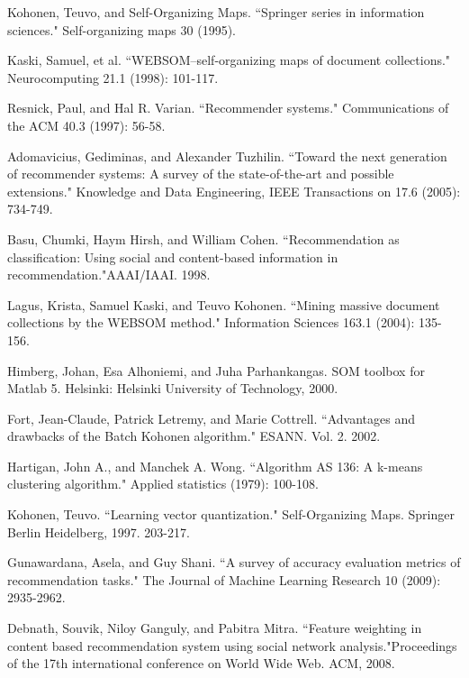 \documentclass[conference]{IEEEtran}
\begin{document}
\begin{thebibliography}{1}

Kohonen, Teuvo, and Self-Organizing Maps. ``Springer series in information sciences." Self-organizing maps 30 (1995).

Kaski, Samuel, et al. ``WEBSOM–self-organizing maps of document collections." Neurocomputing 21.1 (1998): 101-117.

Resnick, Paul, and Hal R. Varian. ``Recommender systems." Communications of the ACM 40.3 (1997): 56-58.

Adomavicius, Gediminas, and Alexander Tuzhilin. ``Toward the next generation of recommender systems: A survey of the state-of-the-art and possible extensions." Knowledge and Data Engineering, IEEE Transactions on 17.6 (2005): 734-749.

Basu, Chumki, Haym Hirsh, and William Cohen. ``Recommendation as classification: Using social and content-based information in recommendation."AAAI/IAAI. 1998.

Lagus, Krista, Samuel Kaski, and Teuvo Kohonen. ``Mining massive document collections by the WEBSOM method." Information Sciences 163.1 (2004): 135-156.

Himberg, Johan, Esa Alhoniemi, and Juha Parhankangas. SOM toolbox for Matlab 5. Helsinki: Helsinki University of Technology, 2000.

Fort, Jean-Claude, Patrick Letremy, and Marie Cottrell. ``Advantages and drawbacks of the Batch Kohonen algorithm." ESANN. Vol. 2. 2002.

Hartigan, John A., and Manchek A. Wong. ``Algorithm AS 136: A k-means clustering algorithm." Applied statistics (1979): 100-108.

Kohonen, Teuvo. ``Learning vector quantization." Self-Organizing Maps. Springer Berlin Heidelberg, 1997. 203-217.

Gunawardana, Asela, and Guy Shani. ``A survey of accuracy evaluation metrics of recommendation tasks." The Journal of Machine Learning Research 10 (2009): 2935-2962.

Debnath, Souvik, Niloy Ganguly, and Pabitra Mitra. ``Feature weighting in content based recommendation system using social network analysis."Proceedings of the 17th international conference on World Wide Web. ACM, 2008.
\end{thebibliography}




\end{document}

